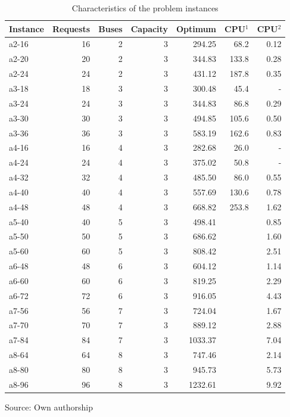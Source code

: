 \documentclass[tuberlin,cic,tc,openright,english,noabntcite,oneside]{iiufrgs}
\begin{document}
\begin{table}[H]
\centering
\caption{Characteristics of the problem instances}
\begin{tabular}{l | r | r | r | r | r | r}
\hline
Instance & Requests & Buses & Capacity & Optimum & CPU$^1$ & CPU$^2$ \\
\hline
a2-16 & 	16 & 	2 & 	3 & 	294.25 & 	68.2 & 	0.12\\
a2-20 & 	20 & 	2 & 	3 & 	344.83 & 	133.8 & 	0.28\\
a2-24 & 	24 & 	2 & 	3 & 	431.12 & 	187.8 & 	0.35\\
a3-18 & 	18 & 	3 & 	3 & 	300.48 & 	45.4 & 	-\\
a3-24 & 	24 & 	3 & 	3 & 	344.83 & 	86.8 & 	0.29\\
a3-30 & 	30 & 	3 & 	3 & 	494.85 & 	105.6 & 	0.50\\
a3-36 & 	36 & 	3 & 	3 & 	583.19 & 	162.6 & 	0.83\\
a4-16 & 	16 & 	4 & 	3 & 	282.68 & 	26.0 & 	-\\
a4-24 & 	24 & 	4 & 	3 & 	375.02 & 	50.8 & 	-\\
a4-32 & 	32 & 	4 & 	3 & 	485.50 & 	86.0 & 	0.55\\
a4-40 & 	40 & 	4 & 	3 & 	557.69 & 	130.6 & 	0.78\\
a4-48 & 	48 & 	4 & 	3 & 	668.82 & 	253.8 & 	1.62\\
a5-40 & 	40 & 	5 & 	3 & 	498.41 & 	 & 	0.85\\
a5-50 & 	50 & 	5 & 	3 & 	686.62 & 	 & 	1.60\\
a5-60 & 	60 & 	5 & 	3 & 	808.42 & 	 & 	2.51\\
a6-48 & 	48 & 	6 & 	3 & 	604.12 & 	 & 	1.14\\
a6-60 & 	60 & 	6 & 	3 & 	819.25 & 	 & 	2.29\\
a6-72 & 	72 & 	6 & 	3 & 	916.05 & 	 & 	4.43\\
a7-56 & 	56 & 	7 & 	3 & 	724.04 & 	 & 	1.67\\
a7-70 & 	70 & 	7 & 	3 & 	889.12 & 	 & 	2.88\\
a7-84 & 	84 & 	7 & 	3 & 	1033.37 & 	 & 	7.04\\
a8-64 & 	64 & 	8 & 	3 & 	747.46 & 	 & 	2.14\\
a8-80 & 	80 & 	8 & 	3 & 	945.73 & 	 & 	5.73\\
a8-96 & 	96 & 	8 & 	3 & 	1232.61 & 	 & 	9.92\\
\hline
\end{tabular}
\center Source: Own authorship
\label{tab:instances-attributes}
\end{table}
\end{document}
